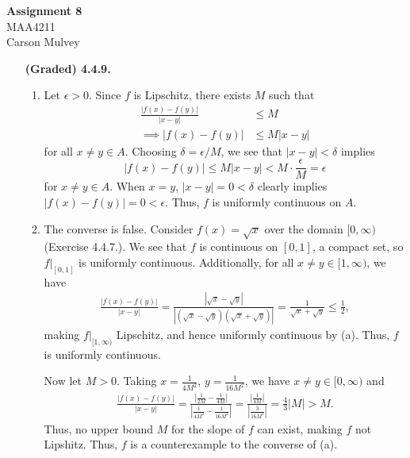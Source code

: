 \documentclass[11pt,letterpaper]{article}
\begin{document}
\begin{center}
    \begin{large}
        \textbf{Assignment 8} \\
        MAA4211 \\
        Carson Mulvey
    \end{large}
\end{center}

\begin{enumerate}
    \item[\textbf{(Graded) 4.4.9.}]
        \begin{enumerate}
            \item Let $\epsilon > 0$. Since $f$ is Lipschitz, there exists $M$ such that
            \begin{align*}
                \frac{|f(x)-f(y)|}{|x-y|} &\leq M \\
                \implies |f(x)-f(y)| &\leq M|x-y|
            \end{align*}
            for all $x \neq y \in A$. Choosing $\delta = \epsilon / M$, we see that $|x-y|<\delta$ implies
            \[
                |f(x)-f(y)| \leq M|x-y| < M \cdot \frac{\epsilon}{M} = \epsilon
            \]
            for $x \neq y \in A$. When $x=y$, $|x-y|=0<\delta$ clearly implies $|f(x)-f(y)|=0<\epsilon$. Thus, $f$ is uniformly continuous on $A$.
            
            \item The converse is false. Consider $f(x)=\sqrt{x}$ over the domain $[0,\infty)$ (Exercise 4.4.7.). We see that $f$ is continuous on $[0,1]$, a compact set, so $f|_{[0,1]}$ is uniformly continuous. Additionally, for all $x\neq y \in [1,\infty)$, we have
            \begin{align*}
                \frac{|f(x)-f(y)|}{|x-y|} = \frac{|\sqrt{x}-\sqrt{y}|}{|(\sqrt{x}-\sqrt{y})(\sqrt{x}+\sqrt{y})|} = \frac{1}{\sqrt{x}+\sqrt{y}} \leq \frac{1}{2},
            \end{align*}
            making $f|_{[1,\infty)}$ Lipschitz, and hence uniformly continuous by (a). Thus, $f$ is uniformly continuous.
            
            Now let $M>0$. Taking $x=\frac{1}{4M^2}$, $y=\frac{1}{16M^2}$, we have $x\neq y \in [0,\infty)$ and
            \begin{align*}
                \frac{|f(x)-f(y)|}{|x-y|} = \frac{\left|\frac{1}{2M}-\frac{1}{4M}\right|}{\left|\frac{1}{4M^2}-\frac{1}{16M^2}\right|} = \frac{\left|\frac{1}{4M}\right|}{\left|\frac{3}{16M^2}\right|} = \frac{4}{3}|M| > M.
            \end{align*}
            Thus, no upper bound $M$ for the slope of $f$ can exist, making $f$ not Lipshitz. Thus, $f$ is a counterexample to the converse of (a).
        \end{enumerate}
\end{enumerate}
\end{document}
